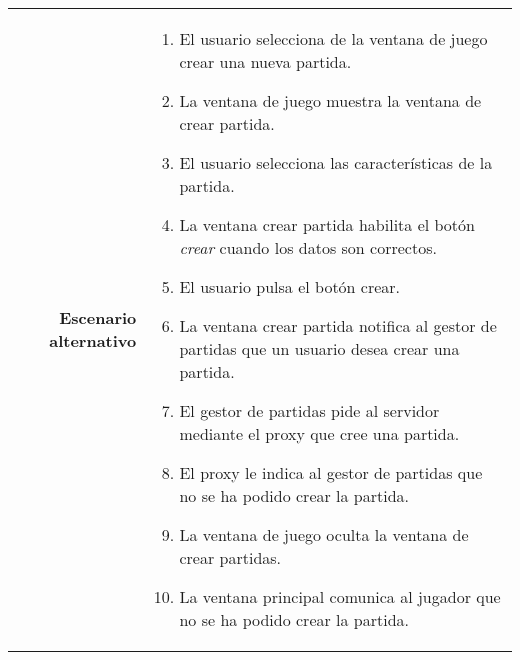 {\begin{tabularx}{0.95\textwidth}{r|X}
\textbf{Escenario alternativo} & \begin{enumerate}
\item El usuario selecciona de la ventana de juego crear una nueva partida.
\item La ventana de juego muestra la ventana de crear partida.
\item El usuario selecciona las características de la partida.
\item La ventana crear partida habilita el botón \emph{crear} cuando los datos son correctos.
\item El usuario pulsa el botón crear.
\item La ventana crear partida notifica al gestor de partidas que un usuario desea crear una partida. 
\item El gestor de partidas pide al servidor mediante el proxy que cree una partida.
\item El proxy le indica al gestor de partidas que no se ha podido crear la partida.
\item La ventana de juego oculta la ventana de crear partidas.
\item La ventana principal comunica al jugador que no se ha podido crear la partida.
\end{enumerate} \\

\end{tabularx}
}


